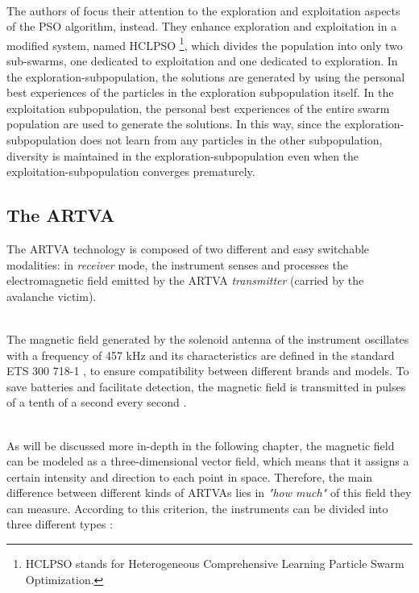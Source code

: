 \documentclass[main]{subfiles}
\begin{document}
\noindent\\
The authors of \cite{PSO_another2} focus their attention to the 
exploration and exploitation aspects of the PSO algorithm, instead.
They enhance exploration and exploitation in a modified system,
named HCLPSO \footnote{HCLPSO stands for Heterogeneous Comprehensive 
Learning Particle Swarm Optimization.}, which divides the population 
into only two sub-swarms, one dedicated to exploitation and 
one dedicated to exploration. 
In the exploration-subpopulation, the solutions are generated by using the personal 
best experiences of the particles in the exploration subpopulation itself. 
In the exploitation subpopulation, the personal best experiences of the
entire swarm population are used to generate the solutions. 
In this way, since the exploration-subpopulation does not
learn from any particles in the other subpopulation, 
diversity is maintained in the exploration-subpopulation even when the 
exploitation-subpopulation converges prematurely.

\subsection{The ARTVA}
The ARTVA technology is composed of two different and easy switchable modalities: 
in \textit{receiver} mode, the instrument senses and processes the 
electromagnetic field emitted by the ARTVA \textit{transmitter} (carried by the 
avalanche victim).

\noindent\\
The magnetic field generated by the solenoid antenna of the instrument oscillates 
with a frequency of 457 kHz and its characteristics are defined in the standard 
ETS 300 718-1 \cite{eu_standard}, to ensure compatibility between different 
brands and models. To save batteries and facilitate detection, the magnetic field 
is transmitted in pulses of a tenth of a second every second \cite{first-model}.

\noindent\\
As will be discussed more in-depth in the following chapter, the magnetic field 
can be modeled as a three-dimensional vector field, which means that it assigns a 
certain intensity and direction to each point in space. Therefore, the main 
difference between different kinds of ARTVAs lies in \textit{"how much"} of this 
field they can measure. According to this criterion, the instruments can be 
divided into three different types \cite{first-model}:
\end{document}
